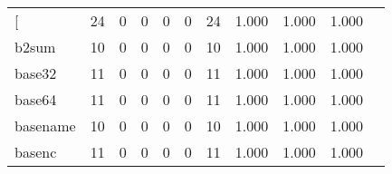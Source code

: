 \begin{longtable}{lp{1.20cm}p{1.20cm}p{1.20cm}p{1.20cm}p{1.20cm}p{1.20cm}p{1.20cm}p{1.20cm}p{1.20cm}p{1.20cm}}
\bottomrule
\endlastfoot
{[}         &                                    24 &                                                  0 &                                                  0 &                                                  0 &                                                  0 &                                                 24 &                                         1.000 &                                              1.000 &                                              1.000 \\
b2sum     &                                    10 &                                                  0 &                                                  0 &                                                  0 &                                                  0 &                                                 10 &                                         1.000 &                                              1.000 &                                              1.000 \\
base32    &                                    11 &                                                  0 &                                                  0 &                                                  0 &                                                  0 &                                                 11 &                                         1.000 &                                              1.000 &                                              1.000 \\
base64    &                                    11 &                                                  0 &                                                  0 &                                                  0 &                                                  0 &                                                 11 &                                         1.000 &                                              1.000 &                                              1.000 \\
basename  &                                    10 &                                                  0 &                                                  0 &                                                  0 &                                                  0 &                                                 10 &                                         1.000 &                                              1.000 &                                              1.000 \\
basenc    &                                    11 &                                                  0 &                                                  0 &                                                  0 &                                                  0 &                                                 11 &                                         1.000 &                                              1.000 &                                              1.000 \\

\end{longtable}
